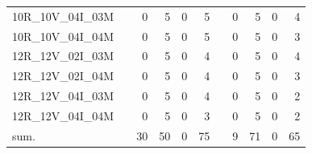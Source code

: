 \begin{tabular}{llrrrrlrrrr}
10R\_10V\_04I\_03M & \hspace{0.1cm} & 0 & 5 & 0 & 5 & \hspace{0.2cm} & 0 & 5 & 0 & 4\\
10R\_10V\_04I\_04M & \hspace{0.1cm} & 0 & 5 & 0 & 5 & \hspace{0.2cm} & 0 & 5 & 0 & 3\\
\addlinespace
12R\_12V\_02I\_03M & \hspace{0.1cm} & 0 & 5 & 0 & 4 & \hspace{0.2cm} & 0 & 5 & 0 & 4\\
12R\_12V\_02I\_04M & \hspace{0.1cm} & 0 & 5 & 0 & 4 & \hspace{0.2cm} & 0 & 5 & 0 & 3\\
12R\_12V\_04I\_03M & \hspace{0.1cm} & 0 & 5 & 0 & 4 & \hspace{0.2cm} & 0 & 5 & 0 & 2\\
12R\_12V\_04I\_04M & \hspace{0.1cm} & 0 & 5 & 0 & 3 & \hspace{0.2cm} & 0 & 5 & 0 & 2\\
\addlinespace
sum. & \hspace{0.1cm} & 30 & 50 & 0 & 75 & \hspace{0.2cm} & 9 & 71 & 0 & 65\\
\bottomrule
\end{tabular}
